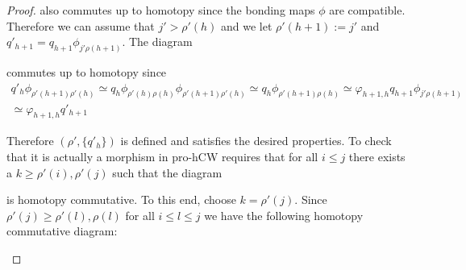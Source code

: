 \documentclass[a4paper,11pt]{article}
\theoremstyle{definition}
\theoremstyle{plain}
\theoremstyle{remark}
\begin{document}
{\begin{proof}
 
also commutes up to homotopy since the bonding maps $\phi$ are compatible. Therefore we can assume that $j' > \rho'(h)$ and we let $\rho'(h+1):=j'$ and $q'_{h+1}= q_{h+1} \phi_{j' \rho(h+1)}$. The diagram


\begin{figure}[H]
\center
{}
\end{figure}


commutes up to homotopy since  
\begin{align*}
q'_{h}\phi_{\rho'(h+1)\rho'(h)}\simeq q_{h}\phi_{\rho'(h)\rho(h)}\phi_{\rho'(h+1)\rho'(h)}\simeq q_{h} \phi_{\rho'(h+1)\rho(h)}\simeq \varphi_{h+1,h} q_{h+1} \phi_{j' \rho(h+1)}\\
\simeq \varphi_{h+1,h}q'_{h+1} 
\end{align*}

Therefore $(\rho',\{q'_{h}\})$ is defined and satisfies the desired properties. To check that it is actually a morphism in pro-hCW requires that for all $i\leq j$ there exists a $k\geq \rho'(i), \rho'(j)$ such that the diagram


\begin{figure}[H]
\center
{}
 \end{figure}
 
 is homotopy commutative. To this end, choose $k=\rho'(j)$. Since $\rho'(j) \geq \rho'(l), \rho(l)$ for all $i\leq l\leq j$ we have the following homotopy commutative diagram:
 
 
\begin{figure}[H]
\center
{}
 \end{figure}
 

\end{proof}}
\end{document}
